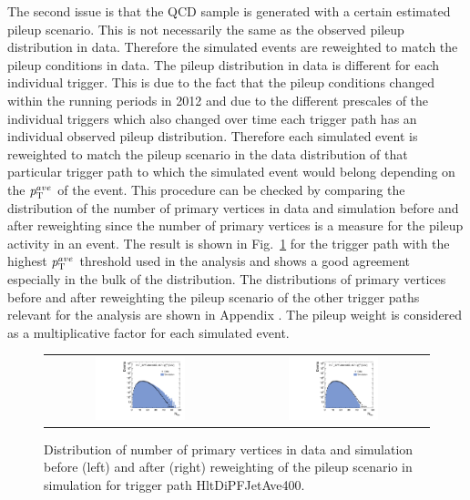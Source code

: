 The second issue is that the QCD sample is generated with a certain estimated pileup scenario. This is not necessarily the same as the observed pileup distribution in data. Therefore the simulated events are reweighted to match the pileup conditions in data. The pileup distribution in data is different for each individual trigger. This is due to the fact that the pileup conditions changed within the running periods in 2012 and due to the different prescales of the individual triggers which also changed over time each trigger path has an individual observed pileup distribution. Therefore each simulated event is reweighted to match the pileup scenario in the data distribution of that particular trigger path to which the simulated event would belong depending on the $\pt^{ave}$ of the event. This procedure can be checked by comparing the distribution of the number of primary vertices in data and simulation before and after reweighting since the number of primary vertices is a measure for the pileup activity in an event. The result is shown in Fig.~\ref{fig:pu_reweight} for the trigger path with the highest $\pt^{ave}$ threshold used in the analysis and shows a good agreement especially in the bulk of the distribution. The distributions of primary vertices before and after reweighting the pileup scenario of the other trigger paths relevant for the analysis are shown in Appendix . The pileup weight is considered as a multiplicative factor for each simulated event.
\begin{figure}[!tp]
  \centering
  \begin{tabular}{cc}
                \includegraphics[width=0.49\textwidth]{figures/NVtx_HltDiPFJetAve400_AfterTriggerSelection.pdf} &
                \includegraphics[width=0.49\textwidth]{figures/NVtx_HltDiPFJetAve400_AfterPUReweighting.pdf}
  \end{tabular}
  \caption{Distribution of number of primary vertices in data and simulation before (left) and after (right) reweighting of the pileup scenario in simulation for trigger path HltDiPFJetAve400.}
  \label{fig:pu_reweight}
\end{figure}

